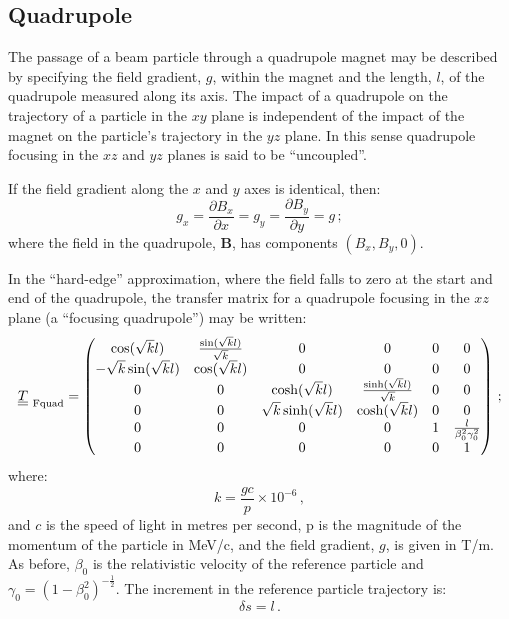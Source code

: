 \subsection{Quadrupole}

The passage of a beam particle through a quadrupole magnet may be
described by specifying the field gradient, $g$, within the magnet and
the length, $l$, of the quadrupole measured along its axis.
The impact of a quadrupole on the trajectory of a particle in the $xy$
plane is independent of the impact of the magnet on the particle's
trajectory in the $yz$ plane.   
In this sense quadrupole focusing in the $xz$ and $yz$ planes is said
to be ``uncoupled''. 

If the field gradient along the $x$ and $y$ axes is identical, then:
\begin{equation}
  g_x = \frac{\partial B_x}{\partial x} =
  g_y = \frac{\partial B_y}{\partial y} = g \, ; 
\end{equation}
where the field in the quadrupole, $\bm{B}$, has components
$(B_x, B_y, 0)$.

In the ``hard-edge'' approximation, where the field falls to zero at
the start and end of the quadrupole, the transfer matrix for a
quadrupole focusing in the $xz$ plane (a ``focusing quadrupole'') may
be written: 
\begin{equation}
  \underline{\underline{T}}_{\rm~Fquad} =
    \begin{pmatrix}
          \cos(\sqrt{k} l) & \frac{\sin(\sqrt{k} l)}{\sqrt{k}} & 0 & 0             & 0 & 0 \\
-\sqrt{k} \sin(\sqrt{k} l) &                  \cos(\sqrt{k} l) & 0 & 0             & 0 & 0 \\
          0 & 0 &           \cosh(\sqrt{k} l) & \frac{\sinh(\sqrt{k} l)}{\sqrt{k}} & 0 & 0 \\
          0 & 0 &  \sqrt{k} \sinh(\sqrt{k} l) &                  \cosh(\sqrt{k} l) & 0 & 0 \\
          0 & 0 & 0 & 0 & 1 & \frac{l}{\beta_0^2 \gamma_0^2} \\
          0 & 0 & 0 & 0 & 0 &                             1
        \end{pmatrix} \, ; 
\end{equation}
where:
\begin{equation}
  k = \frac{gc}{p} \times 10^{-6} \, ,
\end{equation}
and $c$ is the speed of light in metres per second, p is the magnitude
of the momentum of the particle in MeV/c, and the field gradient, $g$,
is given in T/m.
As before, $\beta_0$ is the relativistic velocity of the reference
particle and $\gamma_0=(1-\beta_0^2)^{-\frac{1}{2}}$.
The increment in the reference particle trajectory is:
\begin{equation}
  \delta s = l \, .
\end{equation}

